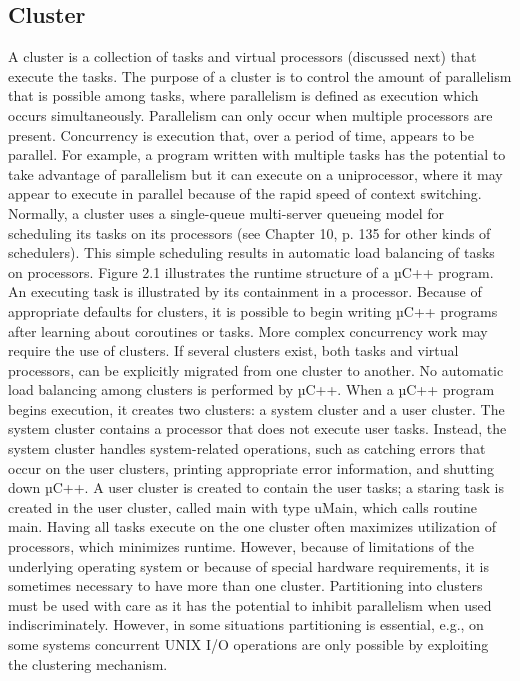 \subsection{Cluster}
A cluster is a collection of tasks and virtual processors (discussed next) that
execute the tasks. The purpose of a cluster
is to control the amount of parallelism that is possible among tasks, where
parallelism is defined as execution which
occurs simultaneously. Parallelism can only occur when multiple processors are
present. Concurrency is execution
that, over a period of time, appears to be parallel. For example, a program
written with multiple tasks has the potential
to take advantage of parallelism but it can execute on a uniprocessor, where it
may appear to execute in parallel
because of the rapid speed of context switching.
Normally, a cluster uses a single-queue multi-server queueing model for
scheduling its tasks on its processors (see
Chapter 10, p. 135 for other kinds of schedulers). This simple scheduling
results in automatic load balancing of tasks
on processors. Figure 2.1 illustrates the runtime structure of a µC++ program.
An executing task is illustrated by its
containment in a processor. Because of appropriate defaults for clusters, it is
possible to begin writing µC++ programs
after learning about coroutines or tasks. More complex concurrency work may
require the use of clusters. If several
clusters exist, both tasks and virtual processors, can be explicitly migrated
from one cluster to another. No automatic
load balancing among clusters is performed by µC++.
When a µC++ program begins execution, it creates two clusters: a system cluster
and a user cluster. The system
cluster contains a processor that does not execute user tasks. Instead, the
system cluster handles system-related operations,
such as catching errors that occur on the user clusters, printing appropriate
error information, and shutting
down µC++. A user cluster is created to contain the user tasks; a staring task
is created in the user cluster, called main
with type uMain, which calls routine main. Having all tasks execute on the one
cluster often maximizes utilization of
processors, which minimizes runtime. However, because of limitations of the
underlying operating system or because
of special hardware requirements, it is sometimes necessary to have more than
one cluster. Partitioning into clusters
must be used with care as it has the potential to inhibit parallelism when used
indiscriminately. However, in some situations
partitioning is essential, e.g., on some systems concurrent UNIX I/O operations
are only possible by exploiting
the clustering mechanism.
